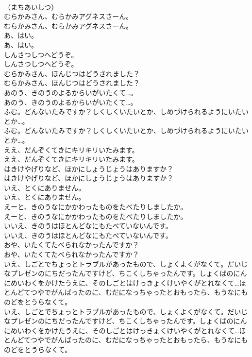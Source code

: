 \documentclass[8pt]{extreport}
\begin{document}
\begin{CJK}{UTF8}{min}
\\	（まちあいしつ）
\\	むらかみさん、むらかみアグネスさーん。
\\	むらかみさん、むらかみアグネスさーん。
\\	あ、はい。
\\	あ、はい。
\\	しんさつしつへどうぞ。
\\	しんさつしつへどうぞ。
\\	むらかみさん、ほんじつはどうされました？
\\	むらかみさん、ほんじつはどうされました？
\\	あのう、きのうのよるからいがいたくて…。
\\	あのう、きのうのよるからいがいたくて…。
\\	ふむ。どんないたみですか？しくしくいたいとか、しめづけられるようにいたいとか…。
\\	ふむ。どんないたみですか？しくしくいたいとか、しめづけられるようにいたいとか…。
\\	ええ、だんぞくてきにキリキリいたみます。
\\	ええ、だんぞくてきにキリキリいたみます。
\\	はきけやげりなど、ほかにしょうじょうはありますか？
\\	はきけやげりなど、ほかにしょうじょうはありますか？
\\	いえ、とくにありません。
\\	いえ、とくにありません。
\\	えーと、きのうなにかかわったものをたべたりしましたか。
\\	えーと、きのうなにかかわったものをたべたりしましたか。
\\	いいえ、きのうはほとんどなにもたべていないんです。
\\	いいえ、きのうはほとんどなにもたべていないんです。
\\	おや、いたくてたべられなかったんですか？
\\	おや、いたくてたべられなかったんですか？
\\	いえ、しごとでちょっとトラブルがあったもので、しょくよくがなくて。だいじなプレゼンのにちだったんですけど、ちこくしちゃったんです。しょくばのにんにめいわくをかけたうえに、そのしごとはけっきょくけいやくがとれなくて…ほとんどてつやでがんばったのに、むだになっちゃったとおもったら、もうなにものどをとうらなくて。
\\	いえ、しごとでちょっとトラブルがあったもので、しょくよくがなくて。だいじなプレゼンのにちだったんですけど、ちこくしちゃったんです。しょくばのにんにめいわくをかけたうえに、そのしごとはけっきょくけいやくがとれなくて…ほとんどてつやでがんばったのに、むだになっちゃったとおもったら、もうなにものどをとうらなくて。

\end{CJK}
\end{document}
